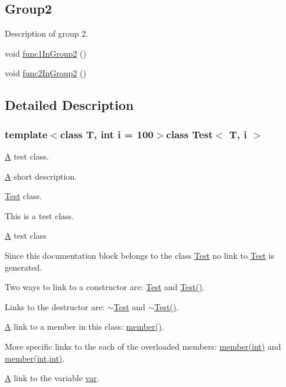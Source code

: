 \subsection*{Group2}
\label{_amgrp6be2faefeff8740e94471f5ae04da6d0}%
Description of group 2. \begin{DoxyCompactItemize}
\item 
void \hyperlink{classTest_a627da802edbda6cebe0849202e3da85e}{func1\-In\-Group2} ()
\item 
void \hyperlink{classTest_ae6d5e6f9e0d9ac70e976be7476499b74}{func2\-In\-Group2} ()
\end{DoxyCompactItemize}


\subsection{Detailed Description}
\subsubsection*{template$<$class T, int i = 100$>$class Test$<$ T, i $>$}

\hyperlink{classA}{A} test class. 

\hyperlink{classA}{A} short description.

\hyperlink{classTest}{Test} class.

This is a test class.

\hyperlink{classA}{A} test class

Since this documentation block belongs to the class \hyperlink{classTest}{Test} no link to \hyperlink{classTest}{Test} is generated.

Two ways to link to a constructor are\-: \hyperlink{classTest}{Test} and \hyperlink{classTest_a44e3a28c552193de099601e2910531f1}{Test()}.

Links to the destructor are\-: \hyperlink{classTest_a31b169208ad4fc5344a7b6b8e1fd00c1}{$\sim$\-Test} and \hyperlink{classTest_a31b169208ad4fc5344a7b6b8e1fd00c1}{$\sim$\-Test()}.

\hyperlink{classA}{A} link to a member in this class\-: \hyperlink{classTest_a703997077e40c222687a0ea2973a9ea1}{member()}.

More specific links to the each of the overloaded members\-: \hyperlink{classTest_ac2f90eeb597ab8382dcdfcdf1df720f1}{member(int)} and \hyperlink{classTest_aea163a1016f022bdb9e4acc3a32fa3eb}{member(int,int)}.

\hyperlink{classA}{A} link to the variable \hyperlink{classTest_ae75d55c8cf6390227d51c0965a4de296}{var}.

